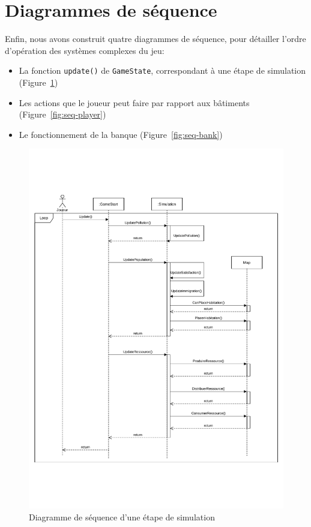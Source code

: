 \documentclass[12pt]{article}
\begin{document}


\section{Diagrammes de séquence}

Enfin, nous avons construit quatre diagrammes de séquence, pour détailler l'ordre d'opération des systèmes complexes du jeu:

\begin{itemize}
    \item La fonction \texttt{update()} de \texttt{GameState}, correspondant à une étape de simulation (Figure~\ref{fig:seq-update})
    \item Les actions que le joueur peut faire par rapport aux bâtiments (Figure~\ref{fig:seq-player})
    \item Le fonctionnement de la banque (Figure~\ref{fig:seq-bank})
\end{itemize}

\begin{figure}[H]
    \includegraphics[width=\textwidth]{uml-sequence-1}
    \caption{Diagramme de séquence d'une étape de simulation\label{fig:seq-update}}
\end{figure}
\end{document}
